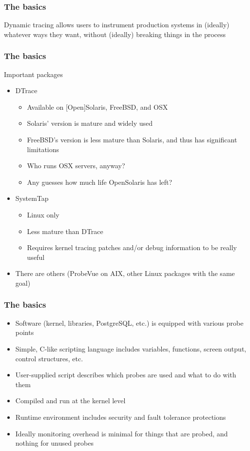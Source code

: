 \documentclass{beamer}
\begin{document}
\begin{frame}
    \frametitle{The basics}
    Dynamic tracing allows users to instrument production systems in (ideally) whatever ways they want, without (ideally) breaking things in the process
\end{frame}

\begin{frame}
    \frametitle{The basics}
    Important packages
    \begin{itemize}
        \item<2-> DTrace
        \begin{itemize}
            \item Available on [Open]Solaris, FreeBSD, and OSX
            \item Solaris' version is mature and widely used
            \item FreeBSD's version is less mature than Solaris, and thus has significant limitations
            \item Who runs OSX servers, anyway?
            \item Any guesses how much life OpenSolaris has left?
        \end{itemize}
        \item<3->SystemTap
        \begin{itemize}
            \item Linux only
            \item Less mature than DTrace
            \item Requires kernel tracing patches and/or debug information to be really useful
        \end{itemize}
        \item<4-> There are others (ProbeVue on AIX, other Linux packages with the same goal)
    \end{itemize}
\end{frame}

\begin{frame}
    \frametitle{The basics}
    \begin{itemize}
        \item Software (kernel, libraries, PostgreSQL, etc.) is equipped with various probe points
        \item Simple, C-like scripting language includes variables, functions, screen output, control structures, etc.
        \item User-supplied script describes which probes are used and what to do with them
        \item Compiled and run at the kernel level
        \item Runtime environment includes security and fault tolerance protections
        \item Ideally monitoring overhead is minimal for things that are probed, and nothing for unused probes
    \end{itemize}
\end{frame}
\end{document}
